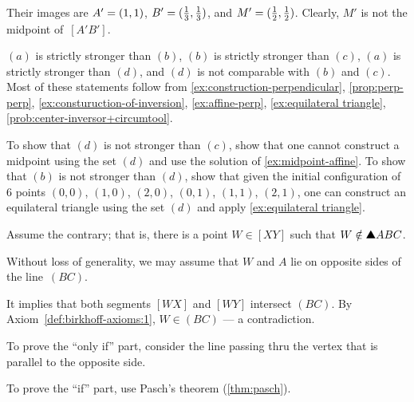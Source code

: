 \begin{multicols}{2}
Their images are $A'\z=(1,1)$, $B'\z=(\tfrac13,\tfrac13)$, and $M'\z=(\tfrac12,\tfrac12)$.
Clearly, $M'$ is not the midpoint of~$[A'B']$.


$(a)$ is strictly stronger than $(b)$,
$(b)$ is strictly stronger than $(c)$,
$(a)$ is strictly stronger than $(d)$,
and $(d)$ is not comparable with $(b)$ and $(c)$.
Most of these statements follow from \ref{ex:construction-perpendicular},
\ref{prop:perp-perp},
\ref{ex:consturuction-of-inversion},
\ref{ex:affine-perp},
\ref{ex:equilateral triangle}, 
\ref{prob:center-inversor+circumtool}.

To show that $(d)$ is not stronger than $(c)$, show that one cannot construct a midpoint using the set $(d)$ and use the solution of \ref{ex:midpoint-affine}.
To show that $(b)$ is not stronger than $(d)$, show that given the initial configuration of 6 points 
$(0,0)$, 
$(1,0)$,
$(2,0)$,
$(0,1)$, 
$(1,1)$,
$(2,1)$,
one can construct an equilateral triangle using the set $(d)$ and apply \ref{ex:equilateral triangle}.

\setcounter{eqtn}{0} 

Assume the contrary; 
that is, there is a point $W\in [XY]$ such that $W\notin\solidtriangle ABC$.



Without loss of generality, we may assume that $W$ and $A$ lie on opposite sides of the line~$(BC)$.

It implies that both segments $[WX]$ and $[WY]$ intersect $(BC)$.
By Axiom~\ref{def:birkhoff-axioms:1}, $W\in (BC)$ --- a contradiction.


To prove the ``only if'' part, consider the line passing thru the vertex that is parallel to the opposite side.

To prove the ``if'' part, use Pasch's theorem (\ref{thm:pasch}).


\end{multicols}
